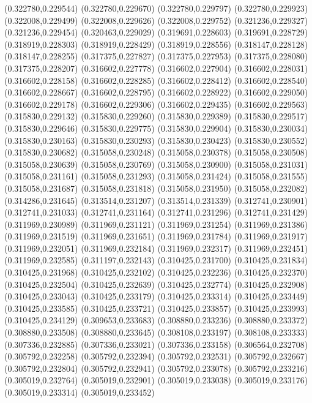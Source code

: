 (0.322780,0.229544)
(0.322780,0.229670)
(0.322780,0.229797)
(0.322780,0.229923)
(0.322008,0.229499)
(0.322008,0.229626)
(0.322008,0.229752)
(0.321236,0.229327)
(0.321236,0.229454)
(0.320463,0.229029)
(0.319691,0.228603)
(0.319691,0.228729)
(0.318919,0.228303)
(0.318919,0.228429)
(0.318919,0.228556)
(0.318147,0.228128)
(0.318147,0.228255)
(0.317375,0.227827)
(0.317375,0.227953)
(0.317375,0.228080)
(0.317375,0.228207)
(0.316602,0.227778)
(0.316602,0.227904)
(0.316602,0.228031)
(0.316602,0.228158)
(0.316602,0.228285)
(0.316602,0.228412)
(0.316602,0.228540)
(0.316602,0.228667)
(0.316602,0.228795)
(0.316602,0.228922)
(0.316602,0.229050)
(0.316602,0.229178)
(0.316602,0.229306)
(0.316602,0.229435)
(0.316602,0.229563)
(0.315830,0.229132)
(0.315830,0.229260)
(0.315830,0.229389)
(0.315830,0.229517)
(0.315830,0.229646)
(0.315830,0.229775)
(0.315830,0.229904)
(0.315830,0.230034)
(0.315830,0.230163)
(0.315830,0.230293)
(0.315830,0.230423)
(0.315830,0.230552)
(0.315830,0.230682)
(0.315058,0.230248)
(0.315058,0.230378)
(0.315058,0.230508)
(0.315058,0.230639)
(0.315058,0.230769)
(0.315058,0.230900)
(0.315058,0.231031)
(0.315058,0.231161)
(0.315058,0.231293)
(0.315058,0.231424)
(0.315058,0.231555)
(0.315058,0.231687)
(0.315058,0.231818)
(0.315058,0.231950)
(0.315058,0.232082)
(0.314286,0.231645)
(0.313514,0.231207)
(0.313514,0.231339)
(0.312741,0.230901)
(0.312741,0.231033)
(0.312741,0.231164)
(0.312741,0.231296)
(0.312741,0.231429)
(0.311969,0.230989)
(0.311969,0.231121)
(0.311969,0.231254)
(0.311969,0.231386)
(0.311969,0.231519)
(0.311969,0.231651)
(0.311969,0.231784)
(0.311969,0.231917)
(0.311969,0.232051)
(0.311969,0.232184)
(0.311969,0.232317)
(0.311969,0.232451)
(0.311969,0.232585)
(0.311197,0.232143)
(0.310425,0.231700)
(0.310425,0.231834)
(0.310425,0.231968)
(0.310425,0.232102)
(0.310425,0.232236)
(0.310425,0.232370)
(0.310425,0.232504)
(0.310425,0.232639)
(0.310425,0.232774)
(0.310425,0.232908)
(0.310425,0.233043)
(0.310425,0.233179)
(0.310425,0.233314)
(0.310425,0.233449)
(0.310425,0.233585)
(0.310425,0.233721)
(0.310425,0.233857)
(0.310425,0.233993)
(0.310425,0.234129)
(0.309653,0.233683)
(0.308880,0.233236)
(0.308880,0.233372)
(0.308880,0.233508)
(0.308880,0.233645)
(0.308108,0.233197)
(0.308108,0.233333)
(0.307336,0.232885)
(0.307336,0.233021)
(0.307336,0.233158)
(0.306564,0.232708)
(0.305792,0.232258)
(0.305792,0.232394)
(0.305792,0.232531)
(0.305792,0.232667)
(0.305792,0.232804)
(0.305792,0.232941)
(0.305792,0.233078)
(0.305792,0.233216)
(0.305019,0.232764)
(0.305019,0.232901)
(0.305019,0.233038)
(0.305019,0.233176)
(0.305019,0.233314)
(0.305019,0.233452)
